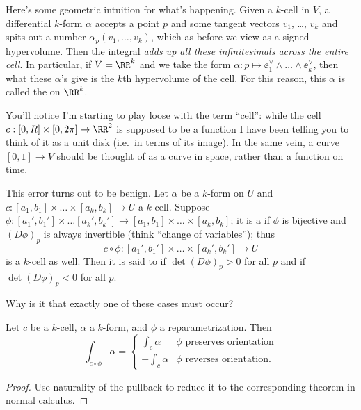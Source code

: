 Here's some geometric intuition for what's happening.
Given a $k$-cell in $V$, a differential $k$-form $\alpha$ accepts a point $p$ and some tangent vectors $v_1$, \dots, $v_k$
and spits out a number $\alpha_p(v_1, \dots, v_k)$,
which as before we view as a signed hypervolume.
Then the integral \emph{adds up all these infinitesimals across the entire cell}.
In particular, if $V = \RR^k$ and we take the form $\alpha : p \mapsto \ee_1^\vee \wedge \dots \wedge \ee_k^\vee$,
then what these $\alpha$'s give is the $k$th hypervolume of the cell.
For this reason, this $\alpha$ is called the  on $\RR^k$.

You'll notice I'm starting to play loose with the term ``cell'':
while the cell $c : [0,R] \times [0,2\pi] \to \RR^2$ is supposed to be a function
I have been telling you to think of it as a unit disk (i.e.\ in terms of its image).
In the same vein, a curve $[0,1] \to V$ should be thought of as a curve in space,
rather than a function on time.

This error turns out to be benign.
Let $\alpha$ be a $k$-form on $U$ and $c : [a_1, b_1] \times \dots \times [a_k, b_k] \to U$ a $k$-cell.
Suppose $\phi : [a_1', b_1'] \times \dots [a_k', b_k'] \to [a_1, b_1] \times \dots \times [a_k, b_k]$;
it is a  if $\phi$ is bijective and $(D\phi)_p$ is always invertible
(think ``change of variables'');
thus
\[ c \circ \phi : [a_1', b_1'] \times \dots \times [a_k',b_k'] \to U \]
is a $k$-cell as well.
Then it is said to  if $\det(D\phi)_p > 0$ for all $p$
and  if $\det(D\phi)_p < 0$ for all $p$.
\begin{exercise}
	Why is it that exactly one of these cases must occur?
\end{exercise}

\begin{theorem}
	Let $c$ be a $k$-cell, $\alpha$ a $k$-form, and $\phi$ a reparametrization.
	Then
	\[ \int_{c \circ \phi} \alpha
		=
		\begin{cases}
			\int_c \alpha & \phi \text{ preserves orientation} \\
			- \int_c \alpha & \phi \text{ reverses orientation}.
		\end{cases}
	\]
\end{theorem}
\begin{proof}
	Use naturality of the pullback to reduce it to the corresponding
	theorem in normal calculus.
\end{proof}

